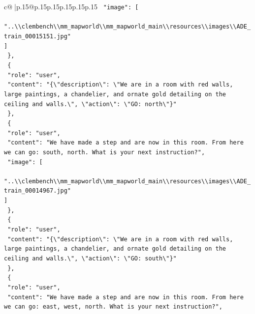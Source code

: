 \documentclass{article}
\begin{document}
{\begin{supertabular}{c@{$\;$}|p{.15\linewidth}@{}p{.15\linewidth}p{.15\linewidth}p{.15\linewidth}p{.15\linewidth}p{.15\linewidth}}
{{{\texttt{    "image": {[}} \\
\texttt{      "..\textbackslash{}\textbackslash{}clembench\textbackslash{}\textbackslash{}mm\_mapworld\textbackslash{}\textbackslash{}mm\_mapworld\_main\textbackslash{}\textbackslash{}resources\textbackslash{}\textbackslash{}images\textbackslash{}\textbackslash{}ADE\_train\_00015151.jpg"} \\
\texttt{    {]}} \\
\texttt{  \},} \\
\texttt{  \{} \\
\texttt{    "role": "user",} \\
\texttt{    "content": "\{\textbackslash{}"description\textbackslash{}": \textbackslash{}"We are in a room with red walls, large paintings, a chandelier, and ornate gold detailing on the ceiling and walls.\textbackslash{}", \textbackslash{}"action\textbackslash{}": \textbackslash{}"GO: north\textbackslash{}"\}"} \\
\texttt{  \},} \\
\texttt{  \{} \\
\texttt{    "role": "user",} \\
\texttt{    "content": "We have made a step and are now in this room. From here we can go: south, north. What is your next instruction?",} \\
\texttt{    "image": {[}} \\
\texttt{      "..\textbackslash{}\textbackslash{}clembench\textbackslash{}\textbackslash{}mm\_mapworld\textbackslash{}\textbackslash{}mm\_mapworld\_main\textbackslash{}\textbackslash{}resources\textbackslash{}\textbackslash{}images\textbackslash{}\textbackslash{}ADE\_train\_00014967.jpg"} \\
\texttt{    {]}} \\
\texttt{  \},} \\
\texttt{  \{} \\
\texttt{    "role": "user",} \\
\texttt{    "content": "\{\textbackslash{}"description\textbackslash{}": \textbackslash{}"We are in a room with red walls, large paintings, a chandelier, and ornate gold detailing on the ceiling and walls.\textbackslash{}", \textbackslash{}"action\textbackslash{}": \textbackslash{}"GO: south\textbackslash{}"\}"} \\
\texttt{  \},} \\
\texttt{  \{} \\
\texttt{    "role": "user",} \\
\texttt{    "content": "We have made a step and are now in this room. From here we can go: east, west, north. What is your next instruction?",} \\
}}}
\end{supertabular}}
\end{document}

